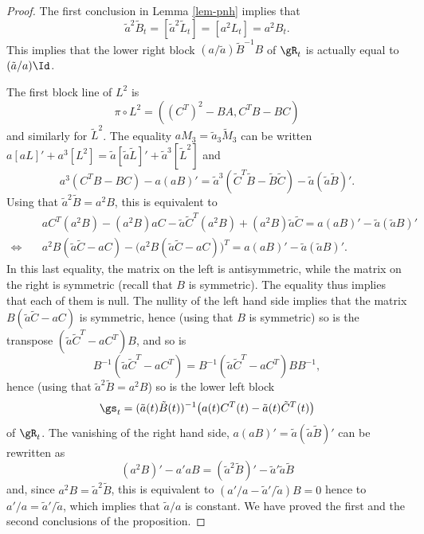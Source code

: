 \begin{proof}
The first conclusion in Lemma \ref{lem-pnh} implies that\vspace*{-3pt}
\[
\tilde a ^2\tilde B_t=[\tilde a^2\tilde L_t]=[a^2L_t]=a^2B_t.
\]
This implies that the lower right block $(a/\tilde a)\tilde B^{-1}B $ of $\gR_t$ is actually equal to $(\tilde a/a ) \Id$.

The first block line of
$L^2$ is\vspace*{-3pt}
\[
\pi \circ L^2=((C^T)^2-BA, C^TB-BC)\]
and similarly for $\tilde L^2$.
The equality $aM_3=\tilde a _3 \tilde M_3$ can be written
$a [aL]'+a^3[L^2]= \tilde a [\tilde a\tilde L]'+\tilde a^3[\tilde L^2]$
and\vspace*{-3pt}
\[
a^3(C^TB-BC)-a(aB)'=\tilde a^3(\tilde C^T\tilde B-\tilde B\tilde C)-\tilde a( \tilde a \tilde B)'.
\]
Using that $\tilde a ^2\tilde B=a^2B$, this is equivalent to\vspace*{-3pt}
\begin{align*}
&\quad aC^T(a^2B)-(a^2B)aC-\tilde a\tilde C^T (a^2B)+ (a^2B)\tilde a \tilde C=
a(aB)'-\tilde a (\tilde a B)'\\
\iff & \quad
a^2B(\tilde a\tilde C-aC) - \big( a^2B(\tilde a\tilde C-aC) \big)^T=
a(aB)'-\tilde a (\tilde a B)'.
\end{align*}
In this last equality, the matrix on the left is antisymmetric, while the matrix on the right is symmetric
(recall that $B$ is symmetric). The equality thus implies that each of them is null.
The nullity of the left hand side implies that the matrix $B(\tilde a\tilde C-aC)$ is symmetric, hence (using that $B$ is symmetric) so is the transpose
$(\tilde a \tilde C^T-aC^T)B$, and so is\vspace*{-3pt}
\[
B^{-1}(\tilde a \tilde C^T-aC^T)=B^{-1}(\tilde a \tilde C^T-aC^T)B B^{-1},
\]
hence (using that $\tilde a ^2\tilde B=a^2B$) so is the lower left block\vspace*{-3pt}
\[
\gs_t=(\tilde a(t)\tilde B(t))^{-1}\big( a(t)C^T(t)-\tilde a(t) \tilde C^T(t)\big)
\]
of $\gR_t$.
The vanishing of the right hand side,
$
a(aB)'=\tilde a (\tilde a \tilde B)'
$
can be rewritten as\vspace*{-3pt}
\[
 (a^2B)'-a'aB=(\tilde a^2 \tilde B)'-\tilde a' \tilde a \tilde B
\]
and, since $a^2B=\tilde a^2 \tilde B$, this is equivalent to $(a'/a -\tilde a'/\tilde a)B=0$ hence to
$ a'/a =\tilde a'/\tilde a$, which implies that $\tilde a/a$ is constant.
We have proved the first and the second conclusions of the proposition.


\end{proof}
